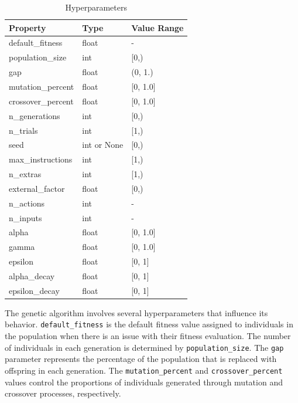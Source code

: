 \documentclass[12pt]{report}
\begin{document}
\begin{table}[!htb]
	\centering
	\begin{tabular}{|l|l|l|}
		\hline
		\textbf{Property}  & \textbf{Type} & \textbf{Value Range} \\
		\hline
		default\_fitness   & float         & -                    \\
		\hline
		population\_size   & int           & [0,)                 \\
		\hline
		gap                & float         & (0, 1.)              \\
		\hline
		mutation\_percent  & float         & [0, 1.0]             \\
		\hline
		crossover\_percent & float         & [0, 1.0]             \\
		\hline
		n\_generations     & int           & [0,)                 \\
		\hline
		n\_trials          & int           & [1,)                 \\
		\hline
		seed               & int or None   & [0,)                 \\
		\hline
		max\_instructions  & int           & [1,)                 \\
		\hline
		n\_extras          & int           & [1,)                 \\
		\hline
		external\_factor   & float         & [0,)                 \\
		\hline
		n\_actions         & int           & -                    \\
		\hline
		n\_inputs          & int           & -                    \\
		\hline
		alpha              & float         & [0, 1.0]             \\
		\hline
		gamma              & float         & [0, 1.0]             \\
		\hline
		epsilon            & float         & [0, 1]               \\
		\hline
		alpha\_decay       & float         & [0, 1]               \\
		\hline
		epsilon\_decay     & float         & [0, 1]               \\
		\hline
	\end{tabular}
	\caption{Hyperparameters}
	\label{tab:hyperparameters}
\end{table}
The genetic algorithm involves several hyperparameters that influence its behavior. \texttt{default\_fitness} is the default fitness value assigned to individuals in the population when there is an issue with their fitness evaluation. The number of individuals in each generation is determined by \texttt{population\_size}. The \texttt{gap} parameter represents the percentage of the population that is replaced with offspring in each generation. The \texttt{mutation\_percent} and \texttt{crossover\_percent} values control the proportions of individuals generated through mutation and crossover processes, respectively.
\end{document}
